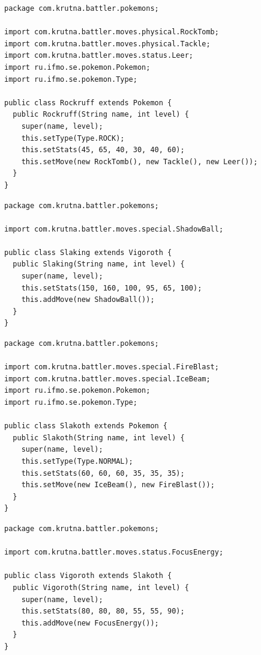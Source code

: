 \documentclass[11pt]{article}
\begin{document}
\begin{lstlisting}
package com.krutna.battler.pokemons;

import com.krutna.battler.moves.physical.RockTomb;
import com.krutna.battler.moves.physical.Tackle;
import com.krutna.battler.moves.status.Leer;
import ru.ifmo.se.pokemon.Pokemon;
import ru.ifmo.se.pokemon.Type;

public class Rockruff extends Pokemon {
  public Rockruff(String name, int level) {
    super(name, level);
    this.setType(Type.ROCK);
    this.setStats(45, 65, 40, 30, 40, 60);
    this.setMove(new RockTomb(), new Tackle(), new Leer());
  }
}
\end{lstlisting}
\begin{lstlisting}
package com.krutna.battler.pokemons;

import com.krutna.battler.moves.special.ShadowBall;

public class Slaking extends Vigoroth {
  public Slaking(String name, int level) {
    super(name, level);
    this.setStats(150, 160, 100, 95, 65, 100);
    this.addMove(new ShadowBall());
  }
}
\end{lstlisting}
\begin{lstlisting}
package com.krutna.battler.pokemons;

import com.krutna.battler.moves.special.FireBlast;
import com.krutna.battler.moves.special.IceBeam;
import ru.ifmo.se.pokemon.Pokemon;
import ru.ifmo.se.pokemon.Type;

public class Slakoth extends Pokemon {
  public Slakoth(String name, int level) {
    super(name, level);
    this.setType(Type.NORMAL);
    this.setStats(60, 60, 60, 35, 35, 35);
    this.setMove(new IceBeam(), new FireBlast());
  }
}
\end{lstlisting}
\begin{lstlisting}
package com.krutna.battler.pokemons;

import com.krutna.battler.moves.status.FocusEnergy;

public class Vigoroth extends Slakoth {
  public Vigoroth(String name, int level) {
    super(name, level);
    this.setStats(80, 80, 80, 55, 55, 90);
    this.addMove(new FocusEnergy());
  }
}
\end{lstlisting}
\end{document}

